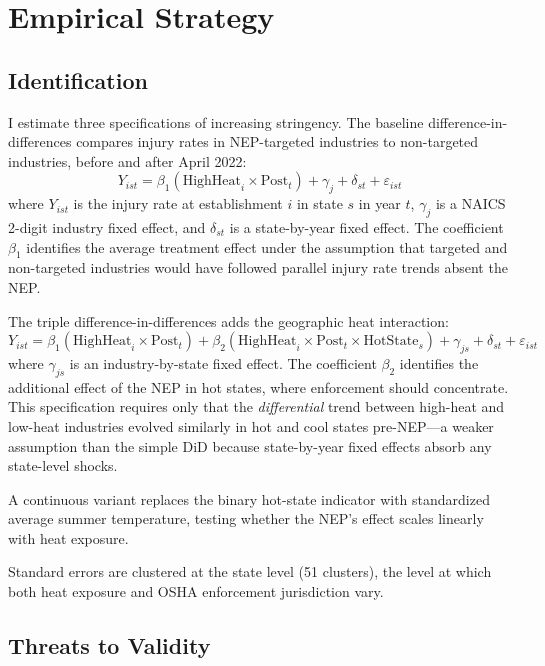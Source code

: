 \documentclass[12pt]{article}
\begin{document}
\section{Empirical Strategy}

\subsection{Identification}

I estimate three specifications of increasing stringency. The baseline difference-in-differences compares injury rates in NEP-targeted industries to non-targeted industries, before and after April 2022:
\begin{equation}
Y_{ist} = \beta_1 (\text{HighHeat}_i \times \text{Post}_t) + \gamma_j + \delta_{st} + \varepsilon_{ist}
\label{eq:did}
\end{equation}
where $Y_{ist}$ is the injury rate at establishment $i$ in state $s$ in year $t$, $\gamma_j$ is a NAICS 2-digit industry fixed effect, and $\delta_{st}$ is a state-by-year fixed effect. The coefficient $\beta_1$ identifies the average treatment effect under the assumption that targeted and non-targeted industries would have followed parallel injury rate trends absent the NEP.

The triple difference-in-differences adds the geographic heat interaction:
\begin{equation}
Y_{ist} = \beta_1 (\text{HighHeat}_i \times \text{Post}_t) + \beta_2 (\text{HighHeat}_i \times \text{Post}_t \times \text{HotState}_s) + \gamma_{js} + \delta_{st} + \varepsilon_{ist}
\label{eq:triple}
\end{equation}
where $\gamma_{js}$ is an industry-by-state fixed effect. The coefficient $\beta_2$ identifies the additional effect of the NEP in hot states, where enforcement should concentrate. This specification requires only that the \textit{differential} trend between high-heat and low-heat industries evolved similarly in hot and cool states pre-NEP---a weaker assumption than the simple DiD because state-by-year fixed effects absorb any state-level shocks.

A continuous variant replaces the binary hot-state indicator with standardized average summer temperature, testing whether the NEP's effect scales linearly with heat exposure.

Standard errors are clustered at the state level (51 clusters), the level at which both heat exposure and OSHA enforcement jurisdiction vary.

\subsection{Threats to Validity}
\end{document}
